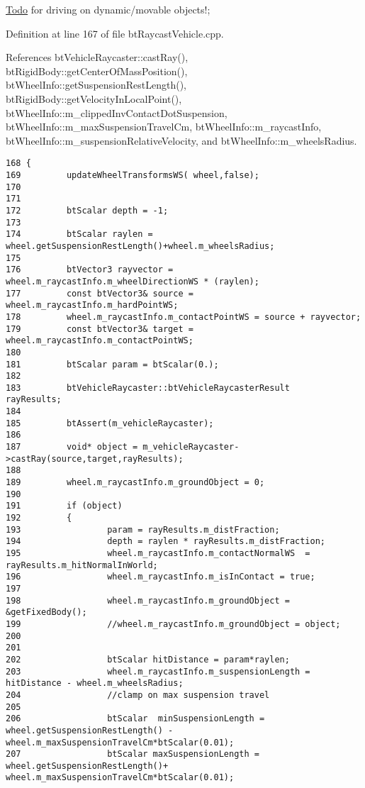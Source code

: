 \begin{Desc}
\item[\hyperlink{todo__todo000038}{Todo}]for driving on dynamic/movable objects!; \end{Desc}


Definition at line 167 of file btRaycastVehicle.cpp.

References btVehicleRaycaster::castRay(), btRigidBody::getCenterOfMassPosition(), btWheelInfo::getSuspensionRestLength(), btRigidBody::getVelocityInLocalPoint(), btWheelInfo::m\_\-clippedInvContactDotSuspension, btWheelInfo::m\_\-maxSuspensionTravelCm, btWheelInfo::m\_\-raycastInfo, btWheelInfo::m\_\-suspensionRelativeVelocity, and btWheelInfo::m\_\-wheelsRadius.

\begin{Code}\begin{verbatim}168 {
169         updateWheelTransformsWS( wheel,false);
170 
171         
172         btScalar depth = -1;
173         
174         btScalar raylen = wheel.getSuspensionRestLength()+wheel.m_wheelsRadius;
175 
176         btVector3 rayvector = wheel.m_raycastInfo.m_wheelDirectionWS * (raylen);
177         const btVector3& source = wheel.m_raycastInfo.m_hardPointWS;
178         wheel.m_raycastInfo.m_contactPointWS = source + rayvector;
179         const btVector3& target = wheel.m_raycastInfo.m_contactPointWS;
180 
181         btScalar param = btScalar(0.);
182         
183         btVehicleRaycaster::btVehicleRaycasterResult    rayResults;
184 
185         btAssert(m_vehicleRaycaster);
186 
187         void* object = m_vehicleRaycaster->castRay(source,target,rayResults);
188 
189         wheel.m_raycastInfo.m_groundObject = 0;
190 
191         if (object)
192         {
193                 param = rayResults.m_distFraction;
194                 depth = raylen * rayResults.m_distFraction;
195                 wheel.m_raycastInfo.m_contactNormalWS  = rayResults.m_hitNormalInWorld;
196                 wheel.m_raycastInfo.m_isInContact = true;
197                 
198                 wheel.m_raycastInfo.m_groundObject = &getFixedBody();
199                 //wheel.m_raycastInfo.m_groundObject = object;
200 
201 
202                 btScalar hitDistance = param*raylen;
203                 wheel.m_raycastInfo.m_suspensionLength = hitDistance - wheel.m_wheelsRadius;
204                 //clamp on max suspension travel
205 
206                 btScalar  minSuspensionLength = wheel.getSuspensionRestLength() - wheel.m_maxSuspensionTravelCm*btScalar(0.01);
207                 btScalar maxSuspensionLength = wheel.getSuspensionRestLength()+ wheel.m_maxSuspensionTravelCm*btScalar(0.01);

\end{verbatim}
\end{Code}
